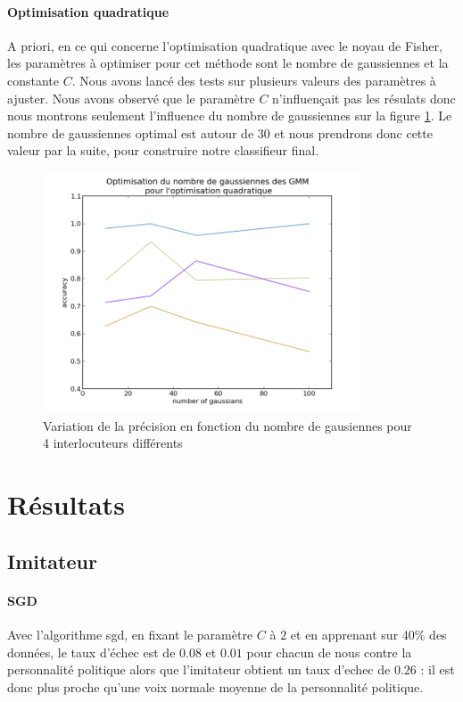 \documentclass{article}
\begin{document}
\paragraph{Optimisation quadratique}
A priori, en ce qui concerne l'optimisation quadratique avec le noyau de Fisher, les paramètres à optimiser pour cet méthode sont le nombre de gaussiennes et la constante $C$.
Nous avons lancé des tests sur plusieurs valeurs des paramètres à ajuster. Nous avons observé que le paramètre $C$ n'influençait pas les résulats donc nous montrons seulement l'influence du nombre de gaussiennes sur la figure \ref{opt_qp}. Le nombre de gaussiennes optimal est autour de 30 et nous prendrons donc cette valeur par la suite, pour construire notre classifieur final.

\begin{figure}[!h]
\includegraphics[width=0.85\textwidth]{img/opt_qp_pdf}
\caption{Variation de la précision en fonction du nombre de gausiennes pour 4 interlocuteurs différents}\label{opt_qp}
\end{figure}

\section{Résultats}
\subsection{Imitateur}
\paragraph{SGD}
Avec l'algorithme sgd, en fixant le paramètre $C$ à $2$ et en apprenant sur 40\% des données, le taux d'échec est de $0.08$ et $0.01$ pour chacun de nous contre la personnalité politique alors que l'imitateur obtient un taux d'echec de $0.26$ : il est donc plus proche qu'une voix normale moyenne de la personnalité politique.
\label{imitateur}



\end{document}
